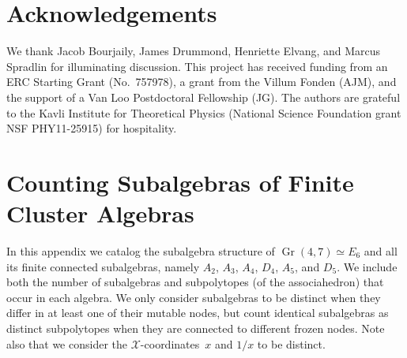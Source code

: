 \documentclass[12pt]{article}
\DeclareMathOperator{\Gr}{Gr}
\def\xcoords{$\mathcal{X}$-coordinates}
\begin{document}


\section*{Acknowledgements}

We thank Jacob Bourjaily, James Drummond, Henriette Elvang, and Marcus Spradlin for illuminating discussion. This project has received funding from an ERC Starting Grant \mbox{(No.\ 757978)}, a grant from the Villum Fonden (AJM), and the support of a Van Loo Postdoctoral Fellowship (JG). The authors are grateful to the Kavli Institute for Theoretical Physics (National Science Foundation grant NSF PHY11-25915) for hospitality. 


\appendix

\newpage

\section{Counting Subalgebras of Finite Cluster Algebras}\label{appendix:subalgebras}
In this appendix we catalog the subalgebra structure of $\Gr(4,7) \simeq E_6$ and all its finite connected subalgebras, namely $A_2$, $A_3$, $A_4$, $D_4$, $A_5$, and $D_5$. We include both the number of subalgebras and subpolytopes (of the associahedron) that occur in each algebra. We only consider subalgebras to be distinct when they differ in at least one of their mutable nodes, but count identical subalgebras as distinct subpolytopes when they are connected to different frozen nodes. Note also that we consider the \xcoords\ $x$ and $1/x$ to be distinct.
\end{document}
